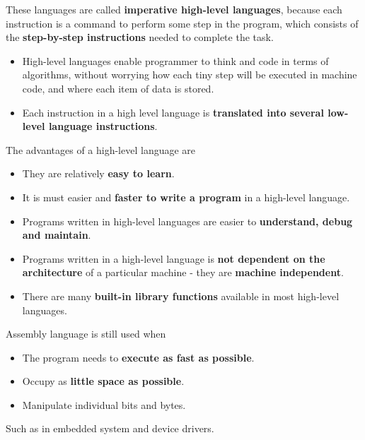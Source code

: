 These languages are called \textbf{imperative high-level languages}, because each instruction is a command to perform some step in the program, which consists of the \textbf{step-by-step instructions} needed to complete the task.

\begin{itemize}
    \item High-level languages enable programmer to think and code in terms of algorithms, without worrying how each tiny step will be executed in machine code, and where each item of data is stored.
    \item Each instruction in a high level language is \textbf{translated into several low-level language instructions}.
\end{itemize}

The advantages of a high-level language are
\begin{itemize}
    \item They are relatively \textbf{easy to learn}.
    \item It is must easier and \textbf{faster to write a program} in a high-level language.
    \item Programs written in high-level languages are easier to \textbf{understand, debug and maintain}.
    \item Programs written in a high-level language is \textbf{not dependent on the architecture} of a particular machine - they are \textbf{machine independent}.
    \item There are many \textbf{built-in library functions} available in most high-level languages.
\end{itemize}

Assembly language is still used when
\begin{itemize}
    \item The program needs to \textbf{execute as fast as possible}.
    \item Occupy as \textbf{little space as possible}.
    \item Manipulate individual bits and bytes.
\end{itemize}
Such as in embedded system and device drivers.
